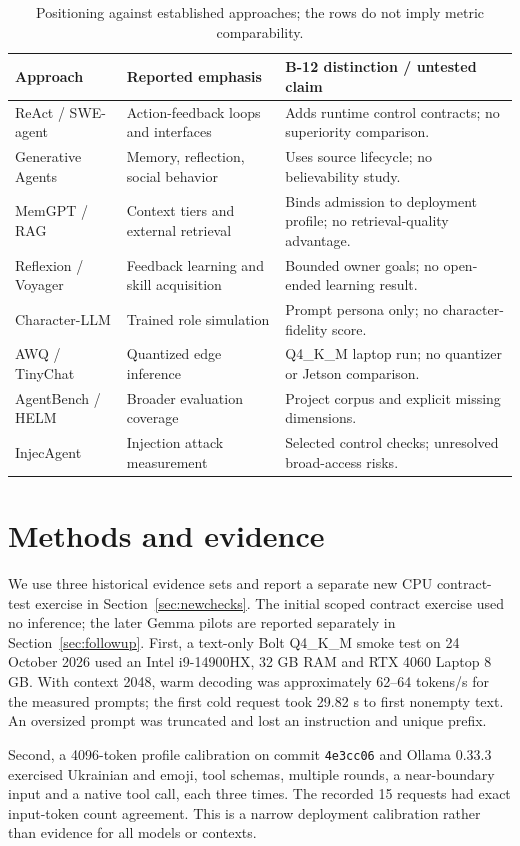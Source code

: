 \documentclass[11pt,a4paper]{article}
\begin{document}
\begin{table}[tbp]
\caption{Positioning against established approaches; the rows do not imply metric comparability.}\label{tab:related}
\centering
\small
\begin{tabularx}{\linewidth}{P{.18\linewidth}YY}\toprule
Approach & Reported emphasis & B-12 distinction / untested claim\\\midrule
ReAct / SWE-agent & Action-feedback loops and interfaces & Adds runtime control contracts; no superiority comparison.\\
Generative Agents & Memory, reflection, social behavior & Uses source lifecycle; no believability study.\\
MemGPT / RAG & Context tiers and external retrieval & Binds admission to deployment profile; no retrieval-quality advantage.\\
Reflexion / Voyager & Feedback learning and skill acquisition & Bounded owner goals; no open-ended learning result.\\
Character-LLM & Trained role simulation & Prompt persona only; no character-fidelity score.\\
AWQ / TinyChat & Quantized edge inference & Q4\_K\_M laptop run; no quantizer or Jetson comparison.\\
AgentBench / HELM & Broader evaluation coverage & Project corpus and explicit missing dimensions.\\
InjecAgent & Injection attack measurement & Selected control checks; unresolved broad-access risks.\\\bottomrule
\end{tabularx}
\end{table}

\section{Methods and evidence}
We use three historical evidence sets and report a separate new CPU contract-test exercise in Section~\ref{sec:newchecks}. The initial scoped contract exercise used no inference; the later Gemma pilots are reported separately in Section~\ref{sec:followup}. First, a text-only Bolt Q4\_K\_M smoke test on 24 October 2026 used an Intel i9-14900HX, 32 GB RAM and RTX 4060 Laptop 8 GB. With context 2048, warm decoding was approximately 62--64 tokens/s for the measured prompts; the first cold request took 29.82 s to first nonempty text. An oversized prompt was truncated and lost an instruction and unique prefix.

Second, a 4096-token profile calibration on commit \texttt{4e3cc06} and Ollama 0.33.3 exercised Ukrainian and emoji, tool schemas, multiple rounds, a near-boundary input and a native tool call, each three times. The recorded 15 requests had exact input-token count agreement. This is a narrow deployment calibration rather than evidence for all models or contexts.
\end{document}
